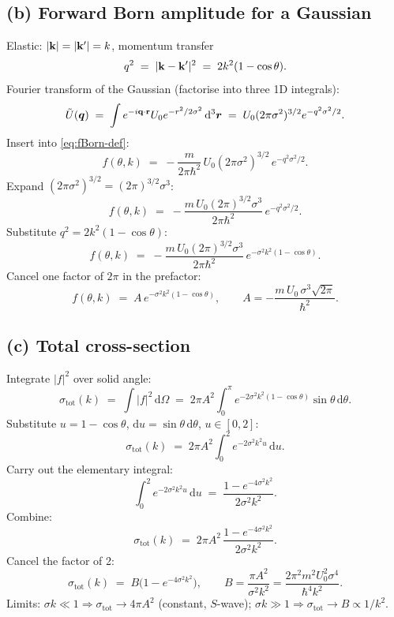 \documentclass[11pt]{article}
\newcommand{\de}{\mathrm{d}}
\begin{document}
\subsection*{(b) Forward Born amplitude for a Gaussian}

Elastic: $|\vb k|=|\vb k'|=k$, momentum transfer
\[
q^{2}\;=\;|\vb k-\vb k'|^{2}\;=\;2k^{2}(1-\cos\theta).
\]
Fourier transform of the Gaussian (factorise into three 1D integrals):
\[
\tilde U(\bm q)\;=\;\int e^{-i\vb q\cdot\vb r}U_{0}e^{-r^{2}/2\sigma^{2}}\,\de^{3}\bm r\;=\;U_{0}(2\pi\sigma^{2})^{3/2}e^{-q^{2}\sigma^{2}/2}.
\]
Insert into \eqref{eq:fBorn-def}:
\[
f(\theta,k)\;=\;-\frac{m}{2\pi\hbar^{2}}\,U_{0}(2\pi\sigma^{2})^{3/2}\,e^{-q^{2}\sigma^{2}/2}.
\]
Expand $(2\pi\sigma^{2})^{3/2}=(2\pi)^{3/2}\sigma^{3}$:
\[
f(\theta,k)\;=\;-\frac{m\,U_{0}(2\pi)^{3/2}\sigma^{3}}{2\pi\hbar^{2}}\,e^{-q^{2}\sigma^{2}/2}.
\]
Substitute $q^{2}=2k^{2}(1-\cos\theta)$:
\[
f(\theta,k)\;=\;-\frac{m\,U_{0}(2\pi)^{3/2}\sigma^{3}}{2\pi\hbar^{2}}\,e^{-\sigma^{2}k^{2}(1-\cos\theta)}.
\]
Cancel one factor of $2\pi$ in the prefactor:
\begin{equation}
\boxed{\;f(\theta,k)\;=\;A\,e^{-\sigma^{2}k^{2}(1-\cos\theta)},\qquad A=-\frac{m\,U_{0}\,\sigma^{3}\sqrt{2\pi}}{\hbar^{2}}.\;}
\label{eq:Aresult}
\end{equation}

\subsection*{(c) Total cross-section}

Integrate $|f|^{2}$ over solid angle:
\[
\sigma_\text{tot}(k)\;=\;\int|f|^{2}\,\de\Omega\;=\;2\pi A^{2}\int_{0}^{\pi}e^{-2\sigma^{2}k^{2}(1-\cos\theta)}\sin\theta\,\de\theta.
\]
Substitute $u=1-\cos\theta$, $\de u=\sin\theta\,\de\theta$, $u\in[0,2]$:
\[
\sigma_\text{tot}(k)\;=\;2\pi A^{2}\int_{0}^{2}e^{-2\sigma^{2}k^{2}u}\,\de u.
\]
Carry out the elementary integral:
\[
\int_{0}^{2}e^{-2\sigma^{2}k^{2}u}\,\de u\;=\;\frac{1-e^{-4\sigma^{2}k^{2}}}{2\sigma^{2}k^{2}}.
\]
Combine:
\[
\sigma_\text{tot}(k)\;=\;2\pi A^{2}\,\frac{1-e^{-4\sigma^{2}k^{2}}}{2\sigma^{2}k^{2}}.
\]
Cancel the factor of 2:
\begin{equation}
\boxed{\;\sigma_\text{tot}(k)\;=\;B\bigl(1-e^{-4\sigma^{2}k^{2}}\bigr),\qquad B=\frac{\pi A^{2}}{\sigma^{2}k^{2}}=\frac{2\pi^{2}m^{2}U_{0}^{2}\sigma^{4}}{\hbar^{4}k^{2}}.\;}
\label{eq:Bresult}
\end{equation}
Limits: $\sigma k\ll 1\Rightarrow\sigma_\text{tot}\to 4\pi A^{2}$ (constant, $S$-wave); $\sigma k\gg 1\Rightarrow\sigma_\text{tot}\to B\propto 1/k^{2}$.
\end{document}

